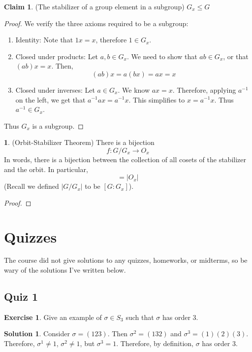 \documentclass[12pt]{article}
\theoremstyle{definition}
\newtheorem{theorem}{\color{ForestGreen}{\textbf{Theorem}}}
\newtheorem{claim}{\color{JungleGreen}Claim}
\newtheorem{exercise}{\color{YellowOrange}Exercise}
\theoremstyle{definition}
\newtheorem{solution}{\color{Goldenrod}Solution}
\begin{document}
\begin{claim}(The stabilizer of a group element in a subgroup)
$G_x \leq G$
\end{claim}
\begin{proof}
We verify the three axioms required to be a subgroup:
\begin{enumerate}
	\item Identity: Note that $1 x = x$, therefore $1 \in G_x$. 
	\item Closed under products: Let $a,b \in G_x$. We need to show that $ab \in G_x$, or that $(ab)x = x$. Then,
	\begin{equation}
		(ab)x = a(bx)= ax = x
	\end{equation}
	\item Closed under inverses: Let $a \in G_x$. We know $ax = x$. Therefore, applying $a^{-1}$ on the left, we get that
	$a^{-1} a x = a^{-1} x$. This simplifies to $x = a^{-1} x$. Thus $a^{-1} \in G_x$. 
\end{enumerate}
Thus $G_x$ is a subgroup. 
\end{proof}

\begin{theorem}(Orbit-Stabilizer Theorem)
There is a bijection 
\begin{equation}
	f : G / G_x \to O_x
\end{equation}
In words, there is a bijection between the collection of all cosets of the stabilizer and the orbit. In particular, 
\begin{equation}
	[G:G_x] = |O_x|
\end{equation}
(Recall we defined $|G / G_x|$ to be $[G:G_x]$). 
\end{theorem}
\begin{proof}

\end{proof}


\section{Quizzes}
The course did not give solutions to any quizzes, homeworks, or midterms, so be wary of the solutions I've written below. 

\subsection{Quiz 1}

\begin{exercise}
Give an example of $\sigma \in S_3$ such that $\sigma$ has order 3. 
\end{exercise}
\begin{solution}
Consider $\sigma = (1 2 3)$. Then $\sigma^2 = (1 3 2)$ and $\sigma^3 = (1)(2)(3)$. Therefore, $\sigma^1 \neq 1$, $\sigma^2 \neq 1$, but $\sigma^3 = 1$. Therefore, by definition, $\sigma$ has order $3$.
\end{solution}
\end{document}
